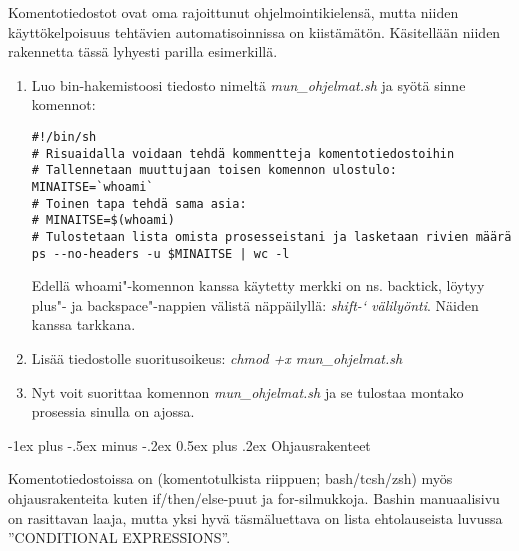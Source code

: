 \documentclass[12pt,portrait,a4]{article}
\makeatletter
\renewcommand{\section}{\@startsection{section}{1}{0mm}%
                                {-1ex plus -.5ex minus -.2ex}%
                                {0.5ex plus .2ex}%
                                {\normalfont\large\bfseries}}
\makeatother
\begin{document}
Komentotiedostot ovat oma rajoittunut ohjelmointikielensä,
mutta niiden käyttökelpoisuus tehtävien automatisoinnissa on
kiistämätön.  Käsitellään niiden rakennetta tässä lyhyesti parilla
esimerkillä.

\begin{enumerate}
\item Luo bin-hakemistoosi tiedosto nimeltä \emph{mun\_ohjelmat.sh} ja syötä
sinne komennot:
\begin{verbatim}
#!/bin/sh
# Risuaidalla voidaan tehdä kommentteja komentotiedostoihin
# Tallennetaan muuttujaan toisen komennon ulostulo:
MINAITSE=`whoami`
# Toinen tapa tehdä sama asia:
# MINAITSE=$(whoami)
# Tulostetaan lista omista prosesseistani ja lasketaan rivien määrä
ps --no-headers -u $MINAITSE | wc -l
\end{verbatim}
Edellä whoami"-komennon kanssa käytetty merkki on ns. backtick, löytyy plus"- ja
backspace"-nappien välistä näppäilyllä: \emph{shift-` välilyönti}.  Näiden
kanssa tarkkana.
\item Lisää tiedostolle suoritusoikeus: \emph{chmod +x mun\_ohjelmat.sh}
\item Nyt voit suorittaa komennon \emph{mun\_ohjelmat.sh} ja se tulostaa
montako prosessia sinulla on ajossa.
\end{enumerate}

\section{Ohjausrakenteet}

Komentotiedostoissa on (komentotulkista riippuen; bash/tcsh/zsh) myös
ohjausrakenteita kuten if/then/else-puut ja for-silmukkoja.  Bashin
manuaalisivu on rasittavan laaja, mutta yksi hyvä täsmäluettava on lista
ehtolauseista luvussa ''CONDITIONAL EXPRESSIONS''.
\end{document}
